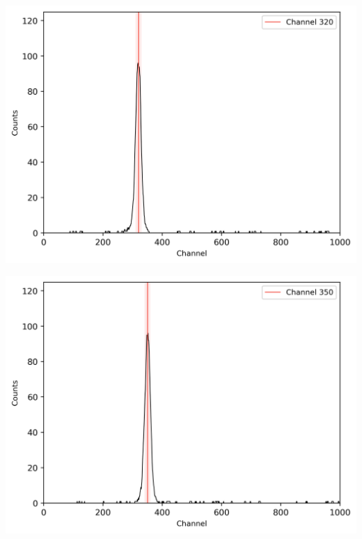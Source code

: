 \begin{multicols}{2}
\begin{center}
\begin{adjustbox}{max width=\linewidth, keepaspectratio}
        \end{adjustbox}
        \label{fig:60CoEnergiewindow2}
    \end{center}
\endminipage
%
\vspace{10mm}
%
\minipage{\linewidth}
    \begin{center}
        \captionsetup{type=figure}
        \begin{adjustbox}{max width=\linewidth, keepaspectratio}
            \includegraphics[]{png/60CoZeitspektrum}
        \end{adjustbox}
        \label{fig:60CoZeitspektrum}
    \end{center}
\endminipage
%
\vspace{10mm}
%
\minipage{\linewidth}
    \begin{center}
        \captionsetup{type=figure}
        \begin{adjustbox}{max width=\linewidth, keepaspectratio}
            \includegraphics[]{png/60CoZeitspektrum20ns}

\end{adjustbox}
\end{center}
\end{multicols}
